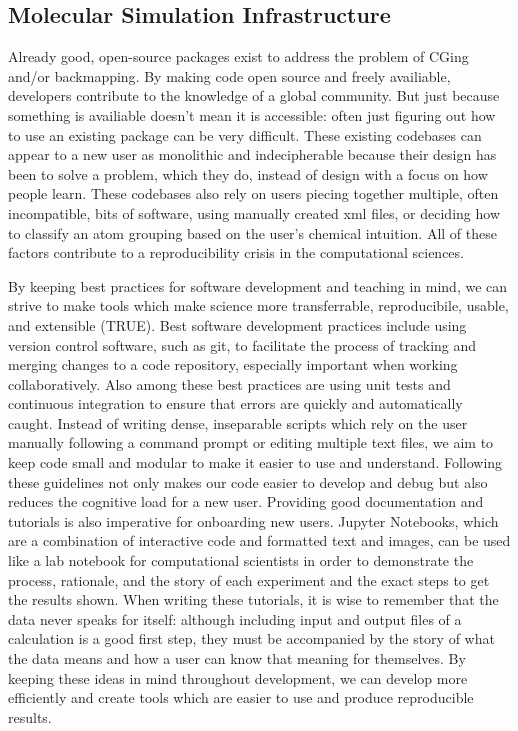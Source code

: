 \subsection*{Molecular Simulation Infrastructure}

Already good, open-source packages exist to address the problem of CGing and/or backmapping\cite{Marrink2007,Ruhle2009,Maerzke2011,MorphCT,Wassenaar2014b}. %
By making code open source and freely availiable, developers contribute to the knowledge of a global community. 
But just because something is availiable doesn't mean it is accessible: often just figuring out how to use an existing package can be very difficult\cite{Cummings2019}.
These existing codebases can appear to a new user as monolithic and indecipherable because their design has been to solve a problem, which they do, instead of design with a focus on how people learn.
These codebases also rely on users piecing together multiple, often incompatible, bits of software, using manually created xml files, or deciding how to classify an atom grouping based on the user's chemical intuition.
All of these factors contribute to a reproducibility crisis in the computational sciences\cite{Baker2016}.

By keeping best practices for software development and teaching in mind, we can strive to make tools which make science more transferrable, reproducibile, usable, and extensible (TRUE)\cite{Thompson2020}.
Best software development practices include using version control software, such as git, to facilitate the process of tracking and merging changes to a code repository, especially important when working collaboratively.
Also among these best practices are using unit tests and continuous integration to ensure that errors are quickly and automatically caught\cite{Wilson2014}.
Instead of writing dense, inseparable scripts which rely on the user manually following a command prompt or editing multiple text files, we aim to keep code small and modular to make it easier to use and understand\cite{Adorf2018a}.
Following these guidelines not only makes our code easier to develop and debug but also reduces the cognitive load for a new user\cite{Jankowski2019}.
Providing good documentation and tutorials is also imperative for onboarding new users.
Jupyter Notebooks, which are a combination of interactive code and formatted text and images, can be used like a lab notebook for computational scientists in order to demonstrate the process, rationale, and the story of each experiment and the exact steps to get the results shown\cite{jupyter, Rule2019a}.
When writing these tutorials, it is wise to remember that the data never speaks for itself: although including input and output files of a calculation is a good first step, they must be accompanied by the story of what the data means and how a user can know that meaning for themselves\cite{SWC, Wilson2016}.
By keeping these ideas in mind throughout development, we can develop more efficiently and create tools which are easier to use and produce reproducible results.

